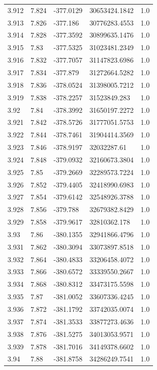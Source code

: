 \begin{tabular}{lllll}
3.912 & 7.824 & -377.0129 & 30653424.1842 & 1.0 \\
3.913 & 7.826 & -377.186 & 30776283.4553 & 1.0 \\
3.914 & 7.828 & -377.3592 & 30899635.1476 & 1.0 \\
3.915 & 7.83 & -377.5325 & 31023481.2349 & 1.0 \\
3.916 & 7.832 & -377.7057 & 31147823.6986 & 1.0 \\
3.917 & 7.834 & -377.879 & 31272664.5282 & 1.0 \\
3.918 & 7.836 & -378.0524 & 31398005.7212 & 1.0 \\
3.919 & 7.838 & -378.2257 & 31523849.283 & 1.0 \\
3.92 & 7.84 & -378.3992 & 31650197.2272 & 1.0 \\
3.921 & 7.842 & -378.5726 & 31777051.5753 & 1.0 \\
3.922 & 7.844 & -378.7461 & 31904414.3569 & 1.0 \\
3.923 & 7.846 & -378.9197 & 32032287.61 & 1.0 \\
3.924 & 7.848 & -379.0932 & 32160673.3804 & 1.0 \\
3.925 & 7.85 & -379.2669 & 32289573.7224 & 1.0 \\
3.926 & 7.852 & -379.4405 & 32418990.6983 & 1.0 \\
3.927 & 7.854 & -379.6142 & 32548926.3788 & 1.0 \\
3.928 & 7.856 & -379.788 & 32679382.8429 & 1.0 \\
3.929 & 7.858 & -379.9617 & 32810362.178 & 1.0 \\
3.93 & 7.86 & -380.1355 & 32941866.4796 & 1.0 \\
3.931 & 7.862 & -380.3094 & 33073897.8518 & 1.0 \\
3.932 & 7.864 & -380.4833 & 33206458.4072 & 1.0 \\
3.933 & 7.866 & -380.6572 & 33339550.2667 & 1.0 \\
3.934 & 7.868 & -380.8312 & 33473175.5598 & 1.0 \\
3.935 & 7.87 & -381.0052 & 33607336.4245 & 1.0 \\
3.936 & 7.872 & -381.1792 & 33742035.0074 & 1.0 \\
3.937 & 7.874 & -381.3533 & 33877273.4636 & 1.0 \\
3.938 & 7.876 & -381.5275 & 34013053.9571 & 1.0 \\
3.939 & 7.878 & -381.7016 & 34149378.6602 & 1.0 \\
3.94 & 7.88 & -381.8758 & 34286249.7541 & 1.0 \\

\end{tabular}
